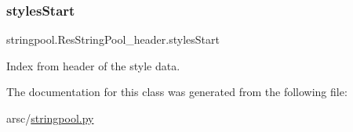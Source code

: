 \subsubsection{\texorpdfstring{styles\+Start}{stylesStart}}
{\footnotesize\ttfamily stringpool.\+Res\+String\+Pool\+\_\+header.\+styles\+Start}



Index from header of the style data. 



The documentation for this class was generated from the following file\+:\begin{DoxyCompactItemize}
\item 
arsc/\mbox{\hyperlink{stringpool_8py}{stringpool.\+py}}\end{DoxyCompactItemize}
